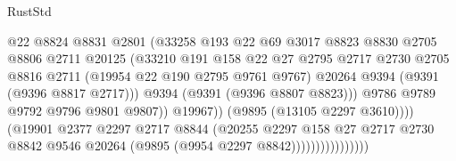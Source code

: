 \begin{lexlean}{RustStd}
\begin{coremodule}
                                        @22
                                        @8824
                                        @8831
                                        @2801
                                        (@33258
                                          @193
                                          @22
                                          @69
                                          @3017
                                          @8823
                                          @8830
                                          @2705
                                          @8806
                                          @2711
                                          @20125
                                          (@33210
                                            @191
                                            @158
                                            @22
                                            @27
                                            @2795
                                            @2717
                                            @2730
                                            @2705
                                            @8816
                                            @2711
                                            (@19954 @22 @190 @2795 @9761 @9767)
                                            @20264
                                            @9394
                                            (@9391 (@9396 @8817 @2717)))
                                          @9394
                                          (@9391 (@9396 @8807 @8823)))
                                        @9786
                                        @9789
                                        @9792
                                        @9796
                                        @9801
                                        @9807))
                                    @19967))
                                (@9895 (@13105 @2297 @3610))))
                            (@19901
                              @2377
                              @2297
                              @2717
                              @8844
                              (@20255
                                @2297
                                @158
                                @27
                                @2717
                                @2730
                                @8842
                                @9546
                                @20264
                                (@9895 (@9954 @2297 @8842))))))))))))))))

\end{coremodule}
\end{lexlean}
